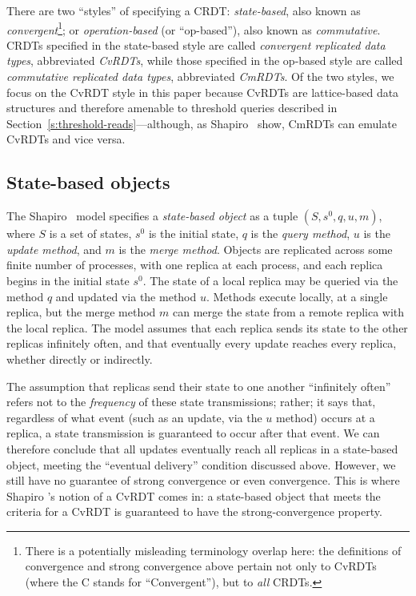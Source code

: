 There are two ``styles'' of specifying a CRDT:
\emph{state-based}, also known as \emph{convergent}\footnote{There is
  a potentially misleading terminology overlap here: the definitions
  of convergence and strong convergence above pertain not only to
  CvRDTs (where the C stands for ``Convergent''), but to \emph{all}
  CRDTs.}; or \emph{operation-based} (or ``op-based''), also known as
\emph{commutative}.  CRDTs specified in the state-based style are
called \emph{convergent replicated data types}, abbreviated
\emph{CvRDTs}, while those specified in the op-based style are
called \emph{commutative replicated data types}, abbreviated
\emph{CmRDTs}.
Of the two styles, we focus on the CvRDT style in this paper because
CvRDTs are lattice-based data structures and therefore amenable to
threshold queries described in
Section~\ref{s:threshold-reads}---although,
as Shapiro \etal~show, CmRDTs can emulate CvRDTs and vice
versa.

\subsection{State-based objects}

The Shapiro \etal~model specifies a \emph{state-based object} as a tuple $(S, s^0,
q, u, m)$, where $S$ is a set of states, $s^0$ is the initial state,
$q$ is the \emph{query method}, $u$ is the \emph{update method}, and
$m$ is the \emph{merge method}.  Objects are replicated across some
finite number of processes, with one replica at each process,
and each replica begins in the initial state $s^0$.  The state
of a local replica may be queried via the method $q$ and updated via
the method $u$.  Methods execute locally, at a single replica, but the
merge method $m$ can merge the state from a remote replica with the
local replica.  The model assumes that each replica
sends its state to the other replicas infinitely often,
and that eventually every
update reaches every replica, whether directly or indirectly.

The assumption that replicas send their state to one another
``infinitely often'' refers not to the \emph{frequency} of these state
transmissions; rather; it says that, regardless of what event (such as
an update, via the $u$ method) occurs at a replica, a state
transmission is guaranteed to occur after that event.  We can
therefore conclude that all updates eventually reach all replicas in a
state-based object, meeting the ``eventual delivery'' condition
discussed above.  However, we still have no guarantee of strong
convergence or even convergence.  This is where Shapiro \etal's notion
of a CvRDT comes in: a state-based object that meets the criteria for
a CvRDT is guaranteed to have the strong-convergence property.

